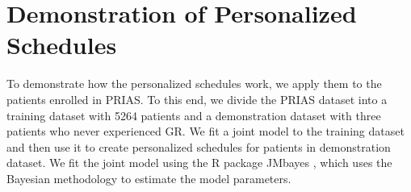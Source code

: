 
\section{Demonstration of Personalized Schedules}
\label{sec : pers_schedule_PRIAS}
To demonstrate how the personalized schedules work, we apply them to the patients enrolled in PRIAS. To this end, we divide the PRIAS dataset into a training dataset with 5264 patients and a demonstration dataset with three patients who never experienced GR. We fit a joint model to the training dataset and then use it to create personalized schedules for patients in demonstration dataset. We fit the joint model using the R package JMbayes \citep{rizopoulosJMbayes}, which uses the Bayesian methodology to estimate the model parameters.

